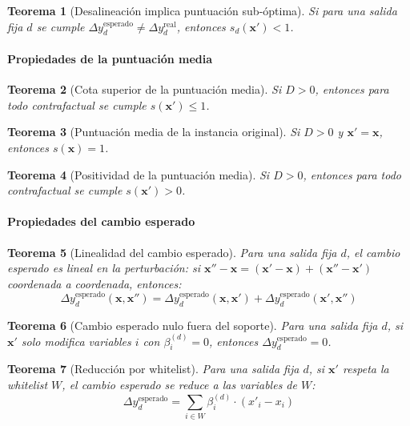 \documentclass[12pt]{report} %
\newtheorem{theorem}{Teorema}
\begin{document}
\begin{theorem}[Desalineación implica puntuación sub-óptima]
    Si para una salida fija $d$ se cumple $\Delta y_d^{\text{esperado}} \neq \Delta y_d^{\text{real}}$, entonces $s_d(\mathbf{x}') < 1$.
\end{theorem}

\paragraph{Propiedades de la puntuación media}

\begin{theorem}[Cota superior de la puntuación media]
    Si $D > 0$, entonces para todo contrafactual se cumple $s(\mathbf{x}') \leq 1$.
\end{theorem}

\begin{theorem}[Puntuación media de la instancia original]
    Si $D > 0$ y $\mathbf{x}' = \mathbf{x}$, entonces $s(\mathbf{x}) = 1$.
\end{theorem}

\begin{theorem}[Positividad de la puntuación media]
    Si $D > 0$, entonces para todo contrafactual se cumple $s(\mathbf{x}') > 0$.
\end{theorem}

\paragraph{Propiedades del cambio esperado}

\begin{theorem}[Linealidad del cambio esperado]
    Para una salida fija $d$, el cambio esperado es lineal en la perturbación: si $\mathbf{x}'' - \mathbf{x} = (\mathbf{x}' - \mathbf{x}) + (\mathbf{x}'' - \mathbf{x}')$ coordenada a coordenada, entonces:
    $$\Delta y_d^{\text{esperado}}(\mathbf{x}, \mathbf{x}'') = \Delta y_d^{\text{esperado}}(\mathbf{x}, \mathbf{x}') + \Delta y_d^{\text{esperado}}(\mathbf{x}', \mathbf{x}'')$$
\end{theorem}

\begin{theorem}[Cambio esperado nulo fuera del soporte]
    Para una salida fija $d$, si $\mathbf{x}'$ solo modifica variables $i$ con $\beta_i^{(d)} = 0$, entonces $\Delta y_d^{\text{esperado}} = 0$.
\end{theorem}

\begin{theorem}[Reducción por whitelist]
    Para una salida fija $d$, si $\mathbf{x}'$ respeta la whitelist $W$, el cambio esperado se reduce a las variables de $W$:
    $$\Delta y_d^{\text{esperado}} = \sum_{i \in W} \beta_i^{(d)} \cdot (x'_i - x_i)$$
\end{theorem}
\end{document}

